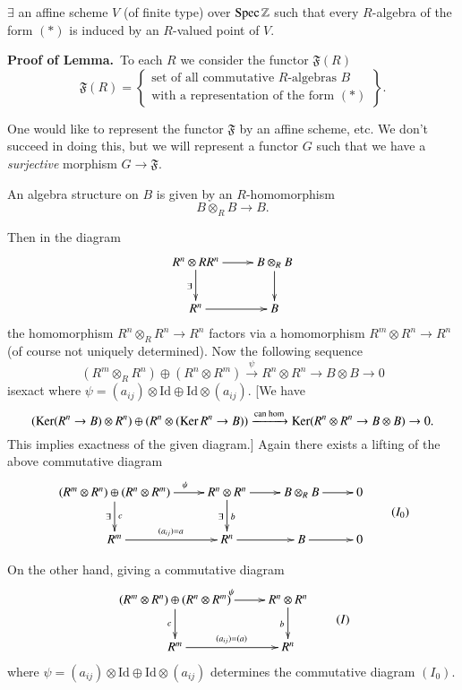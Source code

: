 \begin{lemma}\label{part2-lem5.1}
$\exists$ an affine scheme $V$ (of finite type) over $\operatorname{Spec}
  \mathbb{Z}$ such that every $R$-algebra of the form $(*)$ is induced
  by an $R$-valued point of $V$.
\end{lemma}

\noindent
{\bf Proof of Lemma.}~To each $R$ we consider the functor
$\mathfrak{F}(R)$
\begin{equation*}
\mathfrak{F}(R)=
\left\{
\begin{array}{c}
\text{set of all commutative $R$-algebras $B$}\\
\text{with a representation of the form $(*)$}
\end{array}
\right\}.
\end{equation*}

One would like to represent the functor $\mathfrak{F}$ by an affine
scheme, etc. We don't succeed in doing this, but we will represent a
functor $G$ such that we have a {\em surjective} morphism $G\to
\mathfrak{F}$. 

An algebra structure on $B$ is given by an $R$-homomorphism
$$
B\otimes_{R}B\to B.
$$

Then in the diagram
\[
\xymatrix{
R^{n}\otimes{R}R^{n}\ar[r]\ar[d]_{\exists} & B\otimes_{R}B\ar[d]\\
R^{n}\ar[r] & B
}
\]
the homomorphism $R^{n}\otimes_{R}R^{n}\to R^{n}$ factors via a
homomorphism $R^{m}\otimes R^{n}\to R^{n}$ (of course not uniquely
determined). Now the following sequence
$$
(R^{m}\otimes_{R}R^{n})\oplus (R^{n}\otimes
R^{m})\xrightarrow{\psi}R^{n}\otimes R^{n}\to B\otimes B\to 0
$$
is\pageoriginale exact where $\psi=(a_{ij})\otimes \text{Id}\oplus
\text{Id}\otimes (a_{ij})$. [We have
{\fontsize{10}{11}\selectfont
$$
(\operatorname{Ker} (R^{n}\to B)\otimes R^{n})\oplus (R^{n}\otimes (\operatorname{Ker} R^{n}\to
  B))\xrightarrow{\text{can hom}}\operatorname{Ker} (R^{n}\otimes R^{n}\to B\otimes
  B)\to 0.
$$}
This implies exactness of the given diagram.] Again there exists a
lifting of the above commutative diagram
\begin{equation*}
\vcenter{
\xymatrix{
(R^{m}\otimes R^{n})\oplus (R^{n}\otimes
  R^{m})\ar[d]^c_{\exists}\ar[r]^<<<<{\psi} & R^{n}\otimes R^{n}\ar[r]\ar[d]^{b}_{\exists} &
  B\otimes_{R}B\ar[r] &  0\\
R^{m}\ar[r]^{(a_{ij})=a} & R^{n}\ar[r] & B\ar[r] & 0
}}\tag{$I_{0}$}
\end{equation*}


On the other hand, giving a commutative diagram
\begin{equation*}
\vcenter{
\xymatrix{
(R^{m}\otimes R^{n})\oplus(R^{n}\otimes R^{m})\ar[d]_{c}\ar[r]^{\psi}
  & R^{n}\otimes R^{n}\ar[d]_{b}\\
R^{m}\ar[r]^{(a_{ij})=(a)} & R^{n}
}}\tag{$I$}
\end{equation*}
where $\psi=(a_{ij})\otimes \text{Id}\oplus \text{Id}\otimes (a_{ij})$
determines the commutative diagram $(I_{0})$. 

